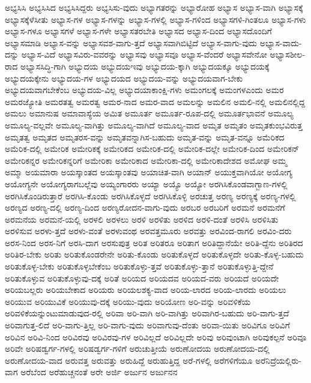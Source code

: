 {ಅಭ್ಯಸಿಸಿ
ಅಭ್ಯಸಿಸಿದ
ಅಭ್ಯಸಿಸಿದ್ದರು
ಅಭ್ಯಸಿಸು-ವುದು
ಅಭ್ಯಾಗತರನ್ನು
ಅಭ್ಯಾರೋಹ
ಅಭ್ಯಾಸ
ಅಭ್ಯಾಸ-ವಾಗಿ
ಅಭ್ಯಾಸಕ್ಕೆ
ಅಭ್ಯಾಸಕ್ಕೆಳೆಸೀತು
ಅಭ್ಯಾಸ-ಗಳ
ಅಭ್ಯಾಸ-ಗಳನ್ನು
ಅಭ್ಯಾಸ-ಗಳಲ್ಲಿ
ಅಭ್ಯಾಸ-ಗಳಿಂದ
ಅಭ್ಯಾಸಗಳಿ-ಗಿಂತಲೂ
ಅಭ್ಯಾಸ-ಗಳು
ಅಭ್ಯಾಸ-ಗಳೂ
ಅಭ್ಯಾಸಗಳೆ
ಅಭ್ಯಾಸ-ಗಳೇ
ಅಭ್ಯಾಸತರಬೇತಿ
ಅಭ್ಯಾಸದ
ಅಭ್ಯಾಸ-ದಿಂದ
ಅಭ್ಯಾಸದೊಂದಿಗೆ
ಅಭ್ಯಾಸಮಾಡಿ
ಅಭ್ಯಾಸ-ವನ್ನು
ಅಭ್ಯಾಸವಶ-ವಾಗು-ತ್ತದೆ
ಅಭ್ಯಾಸವಾಗಿಬಿಟ್ಟಿದೆ
ಅಭ್ಯಾಸ-ವಾಗು-ವುದು
ಅಭ್ಯಾಸ-ವಾದು-ದನ್ನು
ಅಭ್ಯಾಸ-ವಿದೆ
ಅಭ್ಯಾಸವಿರು-ವವರನ್ನು
ಅಭ್ಯಾಸವು
ಅಭ್ಯಾಸವೂ
ಅಭ್ಯಾಸ-ವೆಂದರೆ
ಅಭ್ಯಾಸವೇನೋ
ಅಭ್ಯಾಸಶೀಲ-ರಾದ
ಅಭ್ಯಾಸಸಿದ್ಧಿ-ಗಾಗಿ
ಅಭ್ಯುದಯ
ಅಭ್ಯುದಯಇವು
ಅಭ್ಯುದಯ-ಕ್ಕಾಗಿ
ಅಭ್ಯುದಯಕ್ಕೂ
ಅಭ್ಯುದಯಕ್ಕೆ
ಅಭ್ಯುದಯಕ್ಕೇನು
ಅಭ್ಯುದಯ-ಗಳ
ಅಭ್ಯುದಯದ
ಅಭ್ಯುದಯ-ವನ್ನು
ಅಭ್ಯುದಯವಾಗ-ಬೇಕು
ಅಭ್ಯುದಯವಾಗಬೇಕೆಂಬ
ಅಭ್ಯುದಯ-ವಿಲ್ಲ
ಅಭ್ಯುದಯಾಕಾಂಕ್ಷಿ-ಗಳು
ಅಮಂಗಲಕ್ಕೆ
ಅಮಂಗಳಎಂದು
ಅಮರ
ಅಮರಜ್ಯೋತಿ
ಅಮರತತ್ವ
ಅಮರತ್ವ
ಅಮರ-ನಾದ
ಅಮರ-ವಾದ
ಅಮಲನ್ನು
ಅಮಲಿನ
ಅಮಲಿ-ನಲ್ಲಿ
ಅಮಲಿನಲ್ಲಿದ್ದ
ಅಮಲು
ಅಮಾನುಷ
ಅಮಾವಾಸ್ಯೆಯ
ಅಮಿತ
ಅಮೂರ್ತ
ಅಮೂರ್ತ-ರೂಪ-ದಲ್ಲಿ
ಅಮೂರ್ತಭಾವನೆ
ಅಮೂಲ್ಯ
ಅಮೂಲ್ಯ-ವಲ್ಲವೇ
ಅಮೂಲ್ಯ-ವಾಗಿತ್ತು
ಅಮೂಲ್ಯ-ವಾಗಿದೆ
ಅಮೂಲ್ಯ-ವಾದ
ಅಮೃತ
ಅಮೃತಂ
ಅಮೃತಕುಂಭವಿರುತ್ತ
ಅಮೃತತ್ವ
ಅಮೃತದ
ಅಮೃತರಸ-ವನ್ನು
ಅಮೃತವನ್ನಾಗಿಸ-ಬಹುದು
ಅಮೃತ-ವನ್ನು
ಅಮೃತ-ವನ್ನೂ
ಅಮೆರಿಕದ
ಅಮೆರಿಕ-ದಲ್ಲಿ
ಅಮೇರಿಕ
ಅಮೇರಿಕಕ್ಕೆ
ಅಮೇರಿಕದ
ಅಮೇರಿಕ-ದಲ್ಲಿ
ಅಮೇರಿಕ-ದಲ್ಲೇ
ಅಮೇರಿಕ-ದಿಂದ
ಅಮೇರಿಕನ್
ಅಮೇರಿಕನ್ನರ
ಅಮೇರಿಕನ್ನರಿಗೆ
ಅಮೇರಿಕಾ
ಅಮೇರಿಕಾದ
ಅಮೇರಿಕಾ-ದಲ್ಲಿ
ಅಮೇರಿಕಾದೇಶದ
ಅಮೋಘ
ಅಮ್ಮ
ಅಮ್ಮಾ
ಅಯಮಾರಾ
ಅಯಸ್ಕಾಂತದ
ಅಯಸ್ಕಾಂತವು
ಅಯಾಚಿತ-ವಾಗಿ
ಅಯಾನ್
ಅಯುಕ್ತವಾಗಿಯೋ
ಅಯೋಗ್ಯ
ಅಯೋಗ್ಯನೇ
ಅಯೋಗ್ಯರಾಗಬಲ್ಲೆವು
ಅಯ್ಯಂಗಾರರು
ಅಯ್ಯಾ
ಅಯ್ಯೊ
ಅಯ್ಯೋ
ಅರಗಿಸಿಕೊಂಡವಾಗ್ಬಾಣ-ಗಳಲ್ಲಿ
ಅರಗಿಸಿಕೊಂಡಿರುತ್ತಾರೆ
ಅರಗಿಸಿ-ಕೊಂಡು
ಅರಗಿಸಿಕೊಳ್ಳದೆ
ಅರಗಿಸಿಕೊಳ್ಳಿ
ಅರಚುತ್ತ
ಅರಣ್ಯ
ಅರಣ್ಯಕ್ಕೆ
ಅರಣ್ಯ-ಗಳಲ್ಲಿ
ಅರಣ್ಯದ
ಅರಣ್ಯ-ದಲ್ಲಿ
ಅರಣ್ಯ-ದಿಂದ
ಅರಣ್ಯರೋದನ-ವಾಗು-ವುದು
ಅರಬರ
ಅರಬರಿಗೆ
ಅರಮನೆ
ಅರಮನೆಗೆ
ಅರಮನೆಯ
ಅರಮನೆ-ಯಲ್ಲಿ
ಅರಳಲಿ
ಅರಳಲು
ಅರಳಿ
ಅರಳಿತು
ಅರಳಿದ
ಅರಳಿ-ದಂತೆ
ಅರಳಿಸಿ
ಅರಳಿಸಿತು
ಅರಳಿಸುವ
ಅರಳು-ತ್ತದೆ
ಅರಳು-ವಂತೆ
ಅರಳುವಂಥ
ಅರವತ್ತಮೂರು
ಅರವತ್ತು
ಅರವಿಂದ-ರಾಗಲಿ
ಅರವಿಂ-ದರು
ಅರಸ-ನಿಂದ
ಅರಸ-ನಿಗೆ
ಅರಸಿ-ದಾಗ
ಅರಸುಪುತ್ರ
ಅರಿತ
ಅರಿತರೂ
ಅರಿತಾಗ
ಅರಿತಿದ್ದಾನೆಯೇ
ಅರಿತಿ-ದ್ದೆನು
ಅರಿತಿರದ
ಅರಿತಿರ-ಬೇಕು
ಅರಿತು
ಅರಿತುಕೊಂಡರೇನೇ
ಅರಿತು-ಕೊಂಡು
ಅರಿತುಕೊಳ್ಳದೆ
ಅರಿತುಕೊಳ್ಳದೇ
ಅರಿತು-ಕೊಳ್ಳ-ಬಹುದು
ಅರಿತುಕೊಳ್ಳ-ಬೇಕು
ಅರಿತುಕೊಳ್ಳಬೇಕೆಂಬ
ಅರಿತುಕೊಳ್ಳು-ತ್ತವೆ
ಅರಿತುಕೊಳ್ಳು-ತ್ತಾನೆ
ಅರಿತುಕೊಳ್ಳುತ್ತಿ-ದ್ದೇನೆ
ಅರಿತುಕೊಳ್ಳುವ
ಅರಿತುಕೊಳ್ಳುವು-ದಕ್ಕೆ
ಅರಿತೆ
ಅರಿಯದ
ಅರಿಯದವ
ಅರಿಯದ-ವರು
ಅರಿಯದೆ
ಅರಿಯದೇ
ಅರಿಯಬಲ್ಲರು
ಅರಿಯಬೇಕಾದ
ಅರಿಯರು
ಅರಿಯಲಶಕ್ಯ-ವಾದ
ಅರಿಯ-ಲಾರದ
ಅರಿಯ-ಲಾರದು
ಅರಿಯಲು
ಅರಿಯುವ
ಅರಿಯುವಿಕೆ
ಅರಿಯುವು-ದಕ್ಕೆ
ಅರಿಯು-ವುದು
ಅರಿಯೋಣ
ಅರಿ-ವನ್ನು
ಅರಿವಳಿಕೆಯ
ಅರಿವಳಿಕೆಯನ್ನುಂಟುಮಾಡುವುದ-ರಲ್ಲಿ
ಅರಿವಾ
ಅರಿ-ವಾಗಿ
ಅರಿ-ವಾಗಿತ್ತು
ಅರಿವಾಗಿರ-ಬಹುದು
ಅರಿ-ವಾಗು-ತ್ತದೆ
ಅರಿವಾಗುತ್ತ-ಲಿದೆ
ಅರಿ-ವಾಗು-ತ್ತಿಲ್ಲ
ಅರಿ-ವಾಗು-ವುದು
ಅರಿವಾಗುವು-ದೆಂತು
ಅರಿವಾ-ಯಿತು
ಅರಿವಿಗೂ
ಅರಿವಿಗೆ
ಅರಿವಿನ
ಅರಿವಿ-ನಿಂದ
ಅರಿವಿರವು
ಅರಿವಿರವು-ಗಳ
ಅರಿವಿಲ್ಲದೆ
ಅರಿವಿಲ್ಲದೇ
ಅರಿವು
ಅರಿವುಂಟಾಗಿ
ಅರಿವುಕಲ್ಪನೆ
ಅರಿವೂ
ಅರಿವೇ
ಅರಿಷಡ್ವರ್ಗ-ಗಳಲ್ಲಿ
ಅರಿಷಡ್ವರ್ಗ-ಗಳಿಗೆ
ಅರುಚುತ್ತೀಯೆ
ಅರುಣೋದಯ
ಅರುಣೋದಯ-ದಲ್ಲಿ
ಅರುಣೋದಯ-ವಾದ
ಅರುವತ್ತ
ಅರುವತ್ತು
ಅರುಹಿದ್ದೆ
ಅರುಹುತ್ತಿದ್ದ
ಅರೆ-ಗಳಲ್ಲಿ
ಅರೆಗಳಿಗೆಯೂ
ಅರೆನಿದ್ರೆಯಲ್ಲಿರು-ವಾಗ
ಅರೆಬೆಂದ
ಅರೆಹುಚ್ಚನಂತೆ
ಅರೇ
ಅರ್ಜಿ
ಅರ್ಜುನ
ಅರ್ಜುನನ
}
